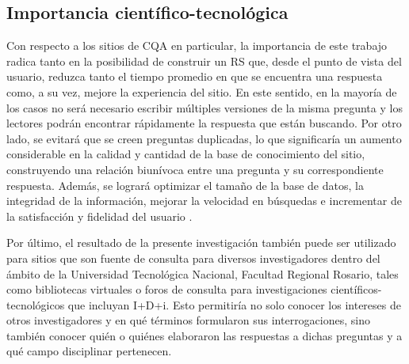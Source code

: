 \subsection{Importancia científico-tecnológica}
\noindent Con respecto a los sitios de CQA en particular, la importancia de este trabajo radica tanto en la posibilidad de construir un RS que, desde el punto de vista del usuario, reduzca tanto el tiempo promedio en que se encuentra una respuesta como, a su vez, mejore la experiencia del sitio. En este sentido, en la mayoría de los casos no será necesario escribir múltiples versiones de la misma pregunta y los lectores podrán encontrar rápidamente la respuesta que están buscando. Por otro lado, se evitará que se creen preguntas duplicadas, lo que significaría un aumento considerable en la calidad y cantidad de la base de conocimiento del sitio, construyendo una relación biunívoca entre una pregunta y su correspondiente respuesta. Además, se logrará optimizar el tamaño de la base de datos, la integridad de la información, mejorar la velocidad en búsquedas e incrementar de la satisfacción y fidelidad del usuario \citep{ricci2011introduction}.

\bigskip Por último, el resultado de la presente investigación también puede ser utilizado para sitios que son fuente de consulta para diversos investigadores dentro del ámbito de la Universidad Tecnológica Nacional, Facultad Regional Rosario, tales como bibliotecas virtuales o foros de consulta para investigaciones científicos-tecnológicos que incluyan I+D+i. Esto permitiría no solo conocer los intereses de otros investigadores y en qué términos formularon sus interrogaciones, sino también conocer quién o quiénes elaboraron las respuestas a dichas preguntas y a qué campo disciplinar pertenecen. 


